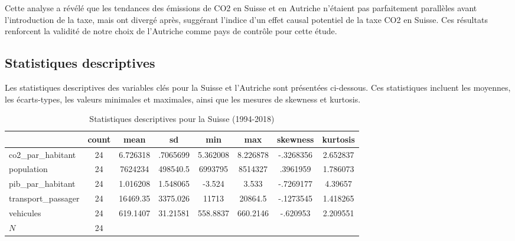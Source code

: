 Cette analyse a révélé que les tendances des émissions de CO2 en Suisse et en Autriche n'étaient pas parfaitement parallèles avant l'introduction de la taxe, mais ont divergé après, suggérant l'indice d'un effet causal potentiel de la taxe CO2 en Suisse. Ces résultats renforcent la validité de notre choix de l'Autriche comme pays de contrôle pour cette étude.


\subsection{Statistiques descriptives}
\label{subsec:stat_descriptives}



Les statistiques descriptives des variables clés pour la Suisse et l'Autriche sont présentées ci-dessous. Ces statistiques incluent les moyennes, les écarts-types, les valeurs minimales et maximales, ainsi que les mesures de skewness et kurtosis.



\begin{table}[H]
    \centering
\def\sym#1{\ifmmode^{#1}\else\(^{#1}\)\fi}
    \footnotesize{
\begin{tabular}{|l*{1}{|ccccccc|}}
\hline
            &       count&        mean&          sd&         min&         max&    skewness&    kurtosis\\
\hline
co2\_par\_habitant&          24&    6.726318&    .7065699&    5.362008&    8.226878&   -.3268356&    2.652837\\
population  &          24&     7624234&    498540.5&     6993795&     8514327&    .3961959&    1.786073\\
pib\_par\_habitant&          24&    1.016208&    1.548065&      -3.524&       3.533&   -.7269177&     4.39657\\
transport\_passager&          24&    16469.35&    3375.026&       11713&     20864.5&   -.1273545&    1.418265\\
vehicules   &          24&    619.1407&    31.21581&    558.8837&    660.2146&    -.620953&    2.209551\\
\hline
\(N\)       &          24&            &            &            &            &            &            \\
\hline
\end{tabular}
}
    \caption{ Statistiques descriptives pour la Suisse (1994-2018)}
    \label{tab:Suisse}
\end{table}


